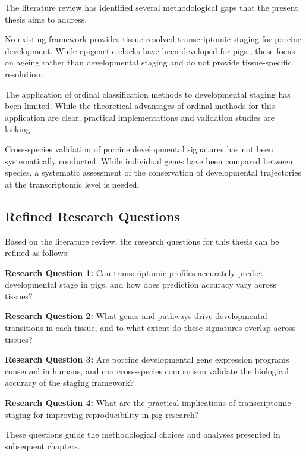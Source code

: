 The literature review has identified several methodological gaps that the present thesis aims to address.

No existing framework provides tissue-resolved transcriptomic staging for porcine development. While epigenetic clocks have been developed for pigs \parencite{schachtschneider_epigenetic_2021, lu_universal_2023, horvath_dna_2013, teschendorff_epigenetic_2025}, these focus on ageing rather than developmental staging and do not provide tissue-specific resolution.

The application of ordinal classification methods to developmental staging has been limited. While the theoretical advantages of ordinal methods for this application are clear, practical implementations and validation studies are lacking.

Cross-species validation of porcine developmental signatures has not been systematically conducted. While individual genes have been compared between species, a systematic assessment of the conservation of developmental trajectories at the transcriptomic level is needed.

\subsection{Refined Research Questions}

Based on the literature review, the research questions for this thesis can be refined as follows:

\textbf{Research Question 1:} Can transcriptomic profiles accurately predict developmental stage in pigs, and how does prediction accuracy vary across tissues?

\textbf{Research Question 2:} What genes and pathways drive developmental transitions in each tissue, and to what extent do these signatures overlap across tissues?

\textbf{Research Question 3:} Are porcine developmental gene expression programs conserved in humans, and can cross-species comparison validate the biological accuracy of the staging framework?

\textbf{Research Question 4:} What are the practical implications of transcriptomic staging for improving reproducibility in pig research?

These questions guide the methodological choices and analyses presented in subsequent chapters.
